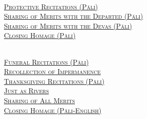 {  \clearpage

  {\libertinusFont\selectfont\textbf{\textsc{\fontsize{18}{12}\selectfont{}}}}\\

  \textsc{\fontsize{14.4}{28}\selectfont
    \hyperref[deva-aradhana]{Protective Recitations (Pāli)} \ifdesktopversion\else\pageref{deva-aradhana}\fi\\
    \hyperref[sharing-merits-departed]{Sharing of Merits with the Departed (Pāli)} \ifdesktopversion\else\pageref{sharing-merits-departed}\fi\\
    \hyperref[sharing-merits-devas]{Sharing of Merits with the Devas (Pāli)} \ifdesktopversion\else\pageref{sharing-merits-devas}\fi\\
    \hyperref[closing-homage]{Closing Homage (Pāli)} \ifdesktopversion\else\pageref{closing-homage}\fi\\
  }

  \vspace{1.0cm}

  {\libertinusFont\selectfont\textbf{\textsc{\fontsize{18}{12}\selectfont{}}}}\\

  \textsc{\fontsize{14.4}{28}\selectfont
    \hyperref[pubba-bhaga-nama-kara-patho]{Funeral Recitations (Pāli)} \ifdesktopversion\else\pageref{pubba-bhaga-nama-kara-patho}\fi\\
    \hyperref[recollection-of-impermanence]{Recollection of Impermanence} \ifdesktopversion\else\pageref{recollection-of-impermanence}\fi\\
    \hyperref[yatha-vari-vaha-pura]{Thanksgiving Recitations (Pāli)} \ifdesktopversion\else\pageref{yatha-vari-vaha-pura}\fi\\
    \hyperref[just-as-rivers]{Just as Rivers} \ifdesktopversion\else\pageref{just-as-rivers}\fi\\
    \hyperref[sharing-all-merits]{Sharing of All Merits} \ifdesktopversion\else\pageref{sharing-all-merits}\fi\\
    \hyperref[closing-homage]{Closing Homage (Pāli-English)} \ifdesktopversion\else\pageref{closing-homage}\fi\\
  }}
